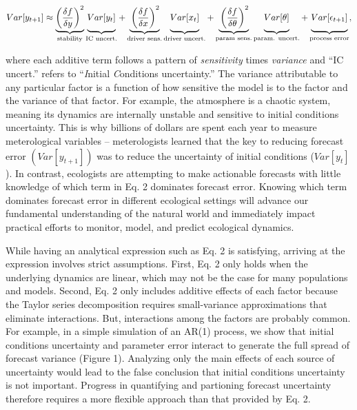 \documentclass[12pt,]{article}
\begin{document}
\begin{align}
Var[y_{t+1}] \approx \underbrace{\left(\frac{\delta f}{\delta y} \right)^2}_{\text{stability}} 
               \underbrace{\vphantom{ \left(\frac{\delta f}{\delta y} \right)^2 } Var[y_t]}_{\text{IC uncert.}} +
               \underbrace{\vphantom{ \left(\frac{\delta f}{\delta y} \right)^2 }\left(\frac{\delta f}{\delta x} \right)^2}_{\text{driver sens.}} 
               \underbrace{\vphantom{ \left(\frac{\delta f}{\delta y} \right)^2 } Var[x_t]}_{\text{driver uncert.}} +
               \underbrace{\vphantom{ \left(\frac{\delta f}{\delta y} \right)^2 }\left(\frac{\delta f}{\delta \theta} \right)^2}_{\text{param sens.}}
               \underbrace{\vphantom{ \left(\frac{\delta f}{\delta y} \right)^2 } Var[\theta]}_{\text{param. uncert.}} +
               \underbrace{\vphantom{ \left(\frac{\delta f}{\delta y} \right)^2 } Var[\epsilon_{t+1}]}_{\text{process error}},
\end{align}

\noindent{}where each additive term follows a pattern of
\emph{sensitivity} times \emph{variance} and ``IC uncert.'' refers to
``\emph{I}nitial \emph{C}onditions uncertainty.'' The variance
attributable to any particular factor is a function of how sensitive the
model is to the factor and the variance of that factor. For example, the
atmosphere is a chaotic system, meaning its dynamics are internally
unstable and sensitive to initial conditions uncertainty. This is why
billions of dollars are spent each year to measure meterological
variables -- meterologists learned that the key to reducing forecast
error \((Var[y_{t+1}])\) was to reduce the uncertainty of initial
conditions (\(Var[y_t]\)). In contrast, ecologists are attempting to
make actionable forecasts with little knowledge of which term in Eq. 2
dominates forecast error. Knowing which term dominates forecast error in
different ecological settings will advance our fundamental understanding
of the natural world and immediately impact practical efforts to
monitor, model, and predict ecological dynamics.

While having an analytical expression such as Eq. 2 is satisfying,
arriving at the expression involves strict assumptions. First, Eq. 2
only holds when the underlying dynamics are linear, which may not be the
case for many populations and models. Second, Eq. 2 only includes
additive effects of each factor because the Taylor series decomposition
requires small-variance approximations that eliminate interactions. But,
interactions among the factors are probably common. For example, in a
simple simulation of an AR(1) process, we show that initial conditions
uncertainty and parameter error interact to generate the full spread of
forecast variance (Figure 1). Analyzing only the main effects of each
source of uncertainty would lead to the false conclusion that initial
conditions uncertainty is not important. Progress in quantifying and
partioning forecast uncertainty therefore requires a more flexible
approach than that provided by Eq. 2.
\end{document}
